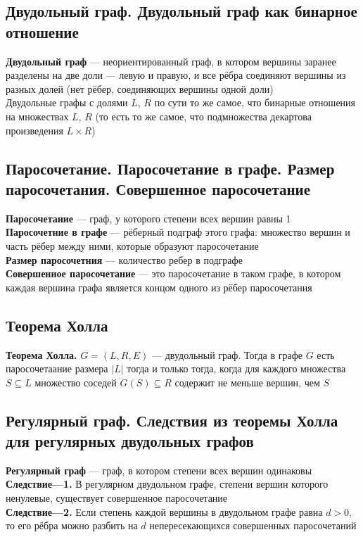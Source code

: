 \documentclass[a4paper]{article}
\begin{document}
\subsection{Двудольный граф. Двудольный граф как бинарное отношение}
\textbf{Двудольный граф} — неориентированный граф, в котором вершины заранее разделены на две доли — левую и правую, и все рёбра соединяют вершины из разных долей (нет рёбер, соединяющих вершины одной доли)\\[2mm]
\indent Двудольные графы с долями $L$, $R$ по сути то же самое, что бинарные отношения на множествах $L$, $R$ (то есть то же самое, что подмножества декартова произведения $L\times R$)

\subsection{Паросочетание. Паросочетание в графе. Размер паросочетания. Совершенное паросочетание}
\textbf{Паросочетание} — граф, у которого степени всех вершин равны 1\\[2mm]
\indent\textbf{Паросочетние в графе} — рёберный подграф этого графа: множество вершин и часть рёбер между ними, которые образуют паросочетание\\[2mm]
\indent\textbf{Размер паросочетния} — количество ребер в подграфе\\[2mm]
\indent\textbf{Совершенное паросочетание} — это паросочетание в таком графе, в котором каждая вершина графа является концом одного из рёбер паросочетания

\subsection{Теорема Холла}
\textbf{Теорема Холла.} $G=(L,R,E)$ — двудольный граф. Тогда в графе $G$ есть паросочетаание размера $|L|$ тогда и только тогда, когда для каждого множества $S\subseteq L$ множество соседей $G(S)\subseteq R$ содержит не меньше вершин, чем $S$

\subsection{Регулярный граф. Следствия из теоремы Холла для регулярных двудольных графов}
\textbf{Регулярный граф} — граф, в котором степени всех вершин одинаковы\\[2mm]
\indent\textbf{Следствие—1.} В регулярном двудольном графе, степени вершин которого ненулевые, существует совершенное паросочетание\\[2mm]
\indent\textbf{Следствие—2.} Если степень каждой вершины в двудольном графе равна $d > 0,$ то его рёбра можно разбить на $d$ непересекающихся совершенных паросочетаний
\end{document}

